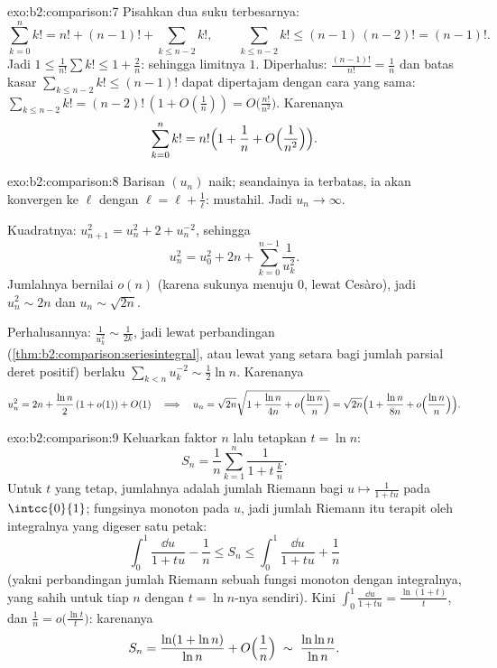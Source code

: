 \begin{solution}{exo:b2:comparison:7}
Pisahkan dua suku terbesarnya:
\[
\sum_{k=0}^{n} k! = n! + (n-1)! + \sum_{k \leq n-2} k! ,
\qquad
\sum_{k\leq n-2} k! \leq (n-1)\,(n-2)! = (n-1)! .
\]
Jadi $1 \leq \frac{1}{n!}\sum k! \leq 1 + \frac{2}{n}$: sehingga
limitnya $1$. Diperhalus: $\frac{(n-1)!}{n!} = \frac1n$ dan batas kasar
$\sum_{k \leq n-2}k! \leq (n-1)!$ dapat dipertajam dengan cara yang sama:
$\sum_{k\leq n-2} k! = (n-2)!\,(1 + O(\frac1n)) = O\bigl(\frac{n!}{n^2}\bigr)$.
Karenanya
\[
\sum_{k=0}^{n} k! = n!\Bigl(1 + \frac1n + O\Bigl(\frac{1}{n^2}\Bigr)\Bigr).
\]
\end{solution}

\begin{solution}{exo:b2:comparison:8}
Barisan $(u_n)$ naik; seandainya ia terbatas, ia akan konvergen ke
$\ell$ dengan $\ell = \ell + \frac1\ell$: mustahil. Jadi $u_n \to \infty$.

Kuadratnya: $u_{n+1}^2 = u_n^2 + 2 + u_n^{-2}$, sehingga
\[
u_n^2 = u_0^2 + 2n + \sum_{k=0}^{n-1} \frac{1}{u_k^2} .
\]
Jumlahnya bernilai $o(n)$ (karena sukunya menuju $0$, lewat Cesàro),
jadi $u_n^2 \sim 2n$ dan $u_n \sim \sqrt{2n}$.

Perhalusannya: $\frac{1}{u_k^2} \sim \frac{1}{2k}$, jadi lewat
perbandingan (\cref{thm:b2:comparison:seriesintegral}, atau lewat yang
setara bagi jumlah parsial deret positif) berlaku $\sum_{k<n} u_k^{-2}
\sim \frac12 \ln n$. Karenanya
\[
u_n^2 = 2n + \frac{\ln n}{2}\,(1 + o(1)) + O(1)
\quad\Longrightarrow\quad
u_n = \sqrt{2n}\sqrt{1 + \frac{\ln n}{4n} + o\Bigl(\frac{\ln
n}{n}\Bigr)}
= \sqrt{2n}\Bigl(1 + \frac{\ln n}{8n} + o\Bigl(\frac{\ln
n}{n}\Bigr)\Bigr).
\]
\end{solution}

\begin{solution}{exo:b2:comparison:9}
Keluarkan faktor $n$ lalu tetapkan $t = \ln n$:
\[
S_n = \frac1n \sum_{k=1}^{n} \frac{1}{1 + t\,\frac kn} .
\]
Untuk $t$ yang tetap, jumlahnya adalah jumlah Riemann bagi $u \mapsto
\frac{1}{1 + tu}$ pada $\intcc{0}{1}$; fungsinya monoton pada $u$, jadi
jumlah Riemann itu terapit oleh integralnya yang digeser satu petak:
\[
\int_0^1 \frac{\dd u}{1 + tu} - \frac1n
\leq S_n \leq \int_0^1 \frac{\dd u}{1 + tu} + \frac1n
\]
(yakni perbandingan jumlah Riemann sebuah fungsi monoton dengan
integralnya, yang sahih untuk tiap $n$ dengan $t = \ln n$-nya sendiri).
Kini $\int_0^1 \frac{\dd u}{1 + tu} = \frac{\ln(1 + t)}{t}$, dan
$\frac1n = o\bigl(\frac{\ln t}{t}\bigr)$: karenanya
\[
S_n = \frac{\ln(1 + \ln n)}{\ln n} + O\Bigl(\frac 1n\Bigr)
\;\sim\; \frac{\ln\ln n}{\ln n} .
\]
\end{solution}

